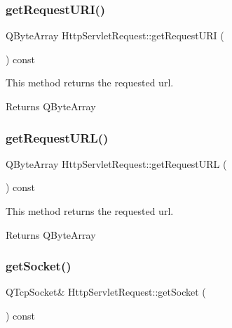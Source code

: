 \subsubsection{\texorpdfstring{get\+Request\+U\+R\+I()}{getRequestURI()}}
{\footnotesize\ttfamily Q\+Byte\+Array Http\+Servlet\+Request\+::get\+Request\+U\+RI (\begin{DoxyParamCaption}{ }\end{DoxyParamCaption}) const\hspace{0.3cm}{\ttfamily [inline]}}



This method returns the requested url. 

\begin{DoxyReturn}{Returns}
Q\+Byte\+Array 
\end{DoxyReturn}
\mbox{\label{class_http_servlet_request_a81efdae7956ec53f0827da7ab39a7a4f}} 
\subsubsection{\texorpdfstring{get\+Request\+U\+R\+L()}{getRequestURL()}}
{\footnotesize\ttfamily Q\+Byte\+Array Http\+Servlet\+Request\+::get\+Request\+U\+RL (\begin{DoxyParamCaption}{ }\end{DoxyParamCaption}) const\hspace{0.3cm}{\ttfamily [inline]}}



This method returns the requested url. 

\begin{DoxyReturn}{Returns}
Q\+Byte\+Array 
\end{DoxyReturn}
\mbox{\label{class_http_servlet_request_a010600c5c9d74b3877b133c1ad6a9250}} 
\subsubsection{\texorpdfstring{get\+Socket()}{getSocket()}}
{\footnotesize\ttfamily Q\+Tcp\+Socket\& Http\+Servlet\+Request\+::get\+Socket (\begin{DoxyParamCaption}{ }\end{DoxyParamCaption}) const\hspace{0.3cm}{\ttfamily [inline]}}



